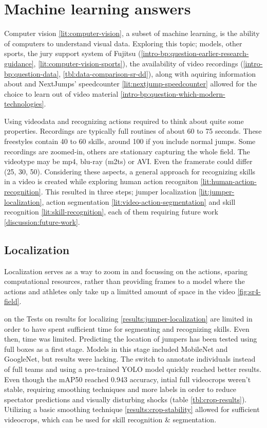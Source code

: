 \section{Machine learning answers}
\label{ch:machine-learning-answers}

Computer vision \ref{lit:computer-vision}, a subset of machine learning, is the ability of computers to understand visual data.
Exploring this topic; models, other sports, the jury support system of Fujitsu (\ref{intro-bp:question-earlier-research-guidance}, \ref{lit:computer-vision-sports}), the availability of video recordings (\ref{intro-bp:question-data}, \ref{tbl:data-comparison-sr-dd}), along with aquiring information about and NextJumps' speedcounter \ref{lit:nextjump-speedcounter} allowed for the choice to learn out of video material \ref{intro-bp:question-which-modern-technologies}.

Using videodata and recognizing actions required to think about quite some properties. Recordings are typically full routines of about 60 to 75 seconds. These freestyles contain 40 to 60 skills, around 100 if you include normal jumps. Some recordings are zoomed-in, others are stationary capturing the whole field. The videotype may be mp4, blu-ray (m2ts) or AVI. Even the framerate could differ (25, 30, 50).
Considering these aspects, a general approach for recognizing skills in a video is created while exploring human action recogniton \ref{lit:human-action-recognition}. This resulted in three steps; jumper localization \ref{lit:jumper-localization}, action segmentation \ref{lit:video-action-segmentation} and skill recognition \ref{lit:skill-recognition}, each of them requiring future work \ref{discussion:future-work}.


\subsection{Localization}

Localization serves as a way to zoom in and focussing on the actions, sparing computational resources, rather than providing frames to a model where the actions and athletes only take up a limitted amount of space in the video \ref{fig:sr4-field}.

on the  Tests on results for localizing \ref{results:jumper-localization} are limited in order to have spent sufficient time for segmenting and recognizing skills. Even then, time was limited. Predicting the location of jumpers has been tested using full boxes as a first stage. Models in this stage included MobileNet and GoogleNet, but results were lacking. The switch to annotate individuals instead of full teams and using a pre-trained YOLO model quickly reached better results.
Even though the mAP50 reached 0.943 accuracy, intial full videocrops weren't stable, requiring smoothing techniques and more labels in order to reduce spectator predictions and visually disturbing shocks (table \ref{tbl:crop-results}). Utilizing a basic smoothing technique \ref{results:crop-stability} allowed for sufficient videocrops, which can be used for skill recognition \& segmentation.

